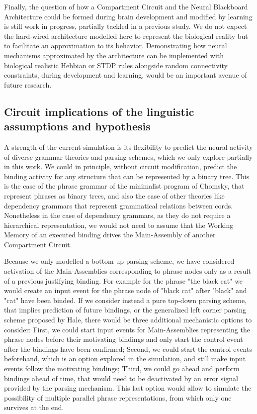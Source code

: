 \documentclass[10pt]{article}
\begin{document}
Finally, the question of how a Compartment Circuit and the Neural Blackboard Architecture could be formed during brain development and modified by learning is still work in progress, partially tackled in a previous study\cite{van_der_Velde_2011}.
We do not expect the hard-wired architecture modelled here to represent the biological reality but to facilitate an approximation to its behavior.
Demonstrating how neural mechanisms approximated by the architecture can be implemented with biological realistic Hebbian or STDP rules alongside random connectivity constraints, during development and learning, would be an important avenue of future research.

\subsection{Circuit implications of the linguistic assumptions and hypothesis}
\label{discussion-linguistics}

A strength of the current simulation is its flexibility to predict the neural activity of diverse grammar theories and parsing schemes, which we only explore partially in this work.
We could in principle, without circuit modification, predict the binding activity for any structure that can be represented by a binary tree.
This is the case of the phrase grammar of the minimalist program of Chomsky\cite{Chomsky_2014}, that represent phrases as binary trees, and also the case of other theories like dependency grammars\cite{nivre2005dependency} that represent grammatical relations between cords.
Nonetheless in the case of dependency grammars, as they do not require a hierarchical representation, we would not need to assume that the Working Memory of an executed binding drives the Main-Assembly of another Compartment Circuit.

Because we only modelled a bottom-up parsing scheme, we have considered activation of the Main-Assemblies corresponding to phrase nodes only as a result of a previous justifying binding.
For example for the phrase "the black cat" we would create an input event for the phrase node of "black cat" after "black" and "cat" have been binded.
If we consider instead a pure top-down parsing scheme, that implies prediction of future bindings, or the generalized left corner parsing scheme proposed by Hale\cite{hale2014automaton}, there would be three additional mechanistic options to consider:
First, we could start input events for Main-Assemblies representing the phrase nodes before their motivating bindings and only start the control event after the bindings have been confirmed;
Second, we could start the control events beforehand, which is an option explored in the simulation, and still make input events follow the motivating bindings;
Third, we could go ahead and perform bindings ahead of time, that would need to be deactivated by an error signal provided by the parsing mechanism. This last option would allow to simulate the possibility of multiple parallel phrase representations, from which only one survives at the end.
\end{document}
